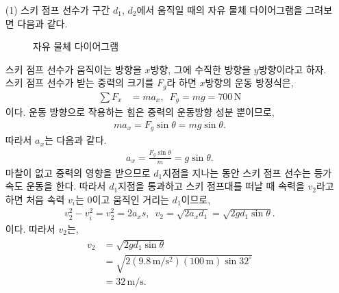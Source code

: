 \documentclass[floatfix,nofootinbib,superscriptaddress,fleqn]{revtex4-2}
\begin{document}
\begin{itemize}
  \item[(1)] 스키 점프 선수가 구간 $d_1$, $d_2$에서 움직일 때의 자유 물체 다이어그램을 
  그려보면 다음과 같다.
  \begin{figure}[h]
    \hspace{1cm}
     \caption{자유 물체 다이어그램}
  \end{figure}
  스키 점프 선수가 움직이는 방향을 $x$방향, 
  그에 수직한 방향을 $y$방향이라고 하자.
   스키 점프 선수가 받는 중력의 크기를 $F_g$라 하면 $x$방향의 운동 방정식은,
  \begin{align}
      \sum F_x &= ma_x,\,\,\,F_g = mg = 700\,\mathrm{N}
  \end{align}
  이다. 운동 방향으로 작용하는 힘은 중력의 운동방향 성분 뿐이므로,
  \begin{align}
    ma_x=F_g\sin{\theta} = mg\sin{\theta}.
  \end{align}
  따라서 $a_x$는 다음과 같다.
  \begin{align}
    a_x = \frac{F_g\sin{\theta}}{m}=g\sin{\theta}.
  \end{align}
  마찰이 없고 중력의 영향을 받으므로 $d_1$지점을 지나는 동안
  스키 점프 선수는 등가속도 운동을 한다. 따라서 $d_1$지점을 통과하고 
  스키 점프대를 떠날 때 속력을 $v_2$라고 하면 처음 속력 $v_i$는 0이고 
  움직인 거리는 $d_1$이므로,
  \begin{align}
    v_2^2-v_i^2 = v_2^2 = 2a_x s,\,\,\, v_2 
    = \sqrt{2a_x d_1}= \sqrt{2g d_1\sin{\theta}}.
  \end{align} 
  이다. 따라서 $v_2$는,
  \begin{align}
    \begin{split}
      v_2 &= \sqrt{2g d_1\sin{\theta}} \\
      &= \sqrt{2(9.8\,\mathrm{m/s^2})(100\,\mathrm{m})\sin{32^\circ}}  \\
      &= 32\,\mathrm{m/s}.
    \end{split}
  \end{align}
  

\end{itemize}
\end{document}
